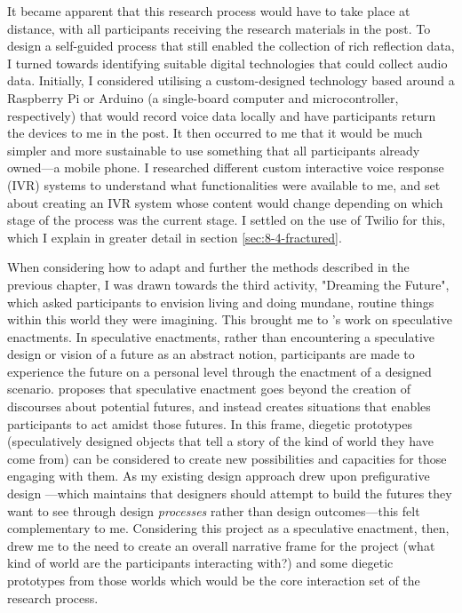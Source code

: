 It became apparent that this research process would have to take place at distance, with all participants receiving the research materials in the post. To design a self-guided process that still enabled the collection of rich reflection data, I turned towards identifying suitable digital technologies that could collect audio data. Initially, I considered utilising a custom-designed technology based around a Raspberry Pi or Arduino (a single-board computer and microcontroller, respectively) that would record voice data locally and have participants return the devices to me in the post. It then occurred to me that it would be much simpler and more sustainable to use something that all participants already owned—a mobile phone. I researched different custom interactive voice response (IVR) systems to understand what functionalities were available to me, and set about creating an IVR system whose content would change depending on which stage of the process was the current stage. I settled on the use of Twilio for this, which I explain in greater detail in section \ref{sec:8-4-fractured}. 

When considering how to adapt and further the methods described in the previous chapter, I was drawn towards the third activity, "Dreaming the Future", which asked participants to envision living and doing mundane, routine things within this world they were imagining. This brought me to \citet{elsden_speculative_2017}'s work on speculative enactments. In speculative enactments, rather than encountering a speculative design or vision of a future as an abstract notion, participants are made to experience the future on a personal level through the enactment of a designed scenario. \citet{elsden_speculative_2017} proposes that speculative enactment goes beyond the creation of discourses about potential futures, and instead creates situations that enables participants to act amidst those futures. In this frame, diegetic prototypes  \citep{kirby_future_2010} (speculatively designed objects that tell a story of the kind of world they have come from) can be considered to create new possibilities and capacities for those engaging with them. As my existing design approach drew upon prefigurative design \citep{asad_prefigurative_2018, asad_prefigurative_2019, asad_tap_2017}—which maintains that designers should attempt to build the futures they want to see through design \textit{processes} rather than design outcomes—this felt complementary to me. Considering this project as a speculative enactment, then, drew me to the need to create an overall narrative frame for the project (what kind of world are the participants interacting with?) and some diegetic prototypes from those worlds which would be the core interaction set of the research process. 

